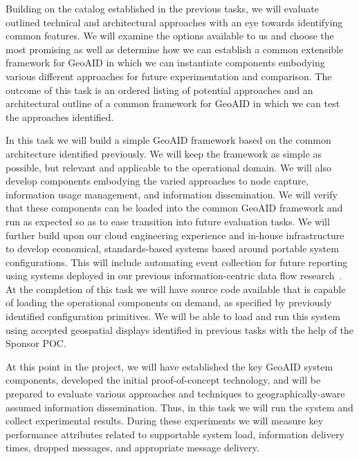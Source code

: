 \documentclass{sbir}
\begin{document}
Building on the catalog established in the previous tasks, we will evaluate outlined technical and architectural approaches with an eye towards identifying common features. We will examine the options available to us and choose the most promising as well as determine how we can establish a common extensible framework for GeoAID in which we can instantiate components embodying various different approaches for future experimentation and comparison.
The outcome of this task is an ordered listing of potential approaches and an architectural outline of a common framework for GeoAID in which we can test the approaches identified.

In this task we will build a simple GeoAID framework based on the common architecture identified previously. We will keep the framework as simple as possible, but relevant and applicable to the operational domain. We will also develop components embodying the varied approaches to node capture, information usage management, and information dissemination. We will verify that these components can be loaded into the common GeoAID framework and run as expected so as to ease transition into future evaluation tasks. 
We will further build upon our cloud engineering experience and in-house infrastructure to develop economical, standards-based systems based around portable system configurations. This will include automating event collection for future reporting using systems deployed in our previous information-centric data flow research~\cite{LaHe:12b}. 
At the completion of this task we will have source code available that is capable of loading the operational components on demand, as specified by previously identified configuration primitives. We will be able to load and run this system using accepted geospatial displays identified in previous tasks with the help of the Sponsor POC.

At this point in the project, we will have established the key GeoAID system components, developed the initial proof-of-concept technology, and will be prepared to evaluate various approaches and techniques to geographically-aware assumed information dissemination. Thus, in this task we will run the system and collect experimental results. During these experiments we will measure key performance attributes related to supportable system load, information delivery times, dropped messages, and appropriate message delivery. 
\end{document}
